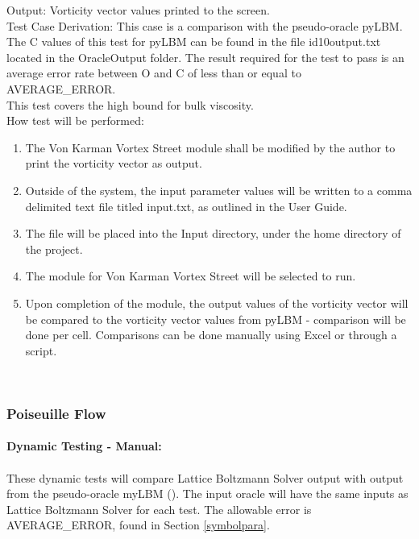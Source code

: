 \documentclass[12pt, titlepage]{article}
\newcommand{\famname}{Lattice Boltzmann Solver}
\begin{document}
\begin{enumerate}
Output: Vorticity vector values printed to the screen. \\ 

Test Case Derivation: This case is a comparison with the pseudo-oracle
pyLBM. The C values of this test for pyLBM can be found in the file
id10output.txt located in the OracleOutput folder. The result required for the
test to pass is an average error rate between O and C of less than or equal to
AVERAGE\_ERROR.\\

This test covers the high bound for bulk viscosity.\\
					
How test will be performed: 

\begin{enumerate}
\item The Von Karman Vortex Street module shall be modified by the author to
  print the vorticity vector as output.
\item Outside of the system, the input parameter values will be written to a
  comma delimited text file titled input.txt, as outlined in the User Guide.
\item The file will be placed into the Input directory, under the home directory
of the project.
\item The module for Von Karman Vortex Street will be selected to run.
\item Upon completion of the module, the output values of the vorticity vector
will be compared to the vorticity vector values from pyLBM - comparison will be
done per cell. Comparisons can be done manually using Excel or through a
script.\\
\end{enumerate}

\end{enumerate}
~\newpage

\subsubsection{Poiseuille Flow}
\label{frpf}

\paragraph{Dynamic Testing - Manual:}
\paragraph{} These dynamic tests will compare {\famname} output with output from
the pseudo-oracle myLBM (\citet{pylbmcode}). The input oracle will have the same
inputs as {\famname} for each test. The allowable error is AVERAGE\_ERROR, found
in Section \ref{symbolpara}.
\end{document}
